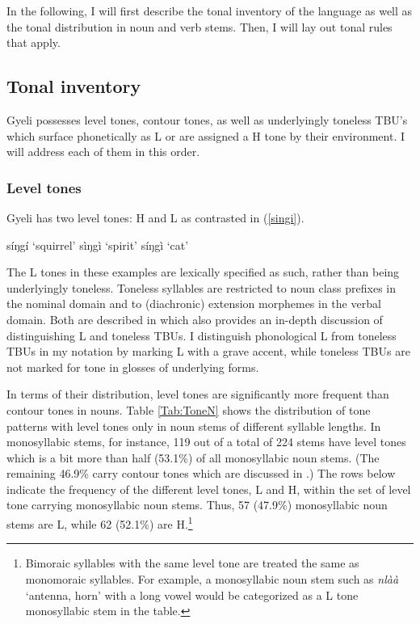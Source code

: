 In the following, I will first describe the tonal inventory of the language as well as the tonal distribution in noun and verb stems. Then, I will lay out tonal rules that apply.


\subsection{Tonal inventory}
\label{sec:Tinventory}


Gyeli possesses level tones, contour tones, as well as underlyingly toneless TBU's which surface phonetically as L or are assigned a H tone by their environment. I will address each of them in this order.

\subsubsection{Level tones}
\label{sec:Level}

Gyeli has two  level tones: H and L as contrasted in (\ref{singi}).

\begin{exe}
\ex\label{singi}
\begin{xlist}
\ex síŋgí `squirrel'
\ex sìŋgì `spirit'
\ex síŋgì `cat'
\end{xlist}
\end{exe}

The L tones in these examples are lexically specified as such, rather than being underlyingly toneless. Toneless syllables are restricted to noun class prefixes in the nominal domain and to (diachronic) extension morphemes in the verbal domain. Both are described in  which also provides an in-depth discussion of distinguishing L and toneless TBUs. I distinguish phonological L from toneless TBUs in my notation by marking L with a grave accent, while toneless TBUs are not marked for tone in glosses of underlying forms.  

In terms of their distribution, level tones are significantly more frequent than contour tones in nouns. Table \ref{Tab:ToneN} shows the distribution of tone patterns with level tones only in noun stems of different syllable lengths. In monosyllabic stems, for instance, 119 out of a total of 224 stems have level tones which is a bit more than half (53.1\%) of all monosyllabic noun stems. (The remaining 46.9\% carry contour tones which are discussed in .) The rows below indicate the frequency of the different level tones, L and H, within the set of level tone carrying monosyllabic noun stems. Thus, 57 (47.9\%) monosyllabic noun stems are L, while 62 (52.1\%) are H.\footnote{Bimoraic syllables with the same level tone are treated the same as monomoraic syllables. For example, a monosyllabic noun stem such as {\itshape nlàà} `antenna, horn' with a long vowel would be categorized as a L tone monosyllabic stem in the table.}

